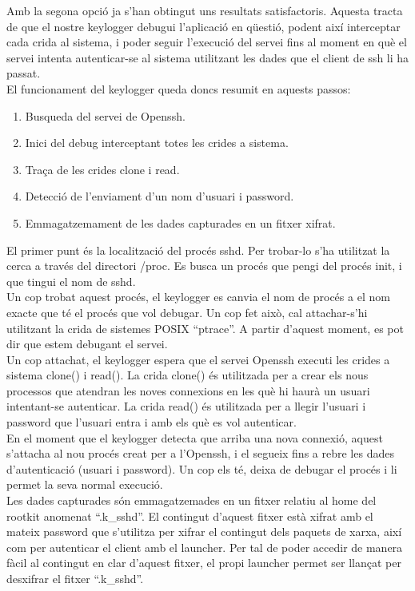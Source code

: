 Amb la segona opció ja s'han obtingut uns resultats satisfactoris. Aquesta tracta de que el nostre keylogger debugui l'aplicació
en qüestió, podent així interceptar cada crida al sistema, i poder seguir l'execució del servei fins al moment
en què el servei intenta autenticar-se al sistema utilitzant les dades que el client de ssh li ha passat. \\

El funcionament del keylogger queda doncs resumit en aquests passos:
\begin{enumerate}
\item Busqueda del servei de Openssh.
\item Inici del debug interceptant totes les crides a sistema.
\item Traça de les crides clone i read.
\item Detecció de l'enviament d'un nom d'usuari i password.
\item Emmagatzemament de les dades capturades en un fitxer xifrat.
\end{enumerate}

El primer punt és la localització del procés sshd. Per trobar-lo s'ha utilitzat la cerca a través del
directori /proc. Es busca un procés que pengi del procés init, i que tingui el nom de sshd. \\

Un cop trobat aquest procés, el keylogger es canvia el nom de procés a el nom 
exacte que té el procés que vol debugar. Un cop fet això, cal attachar-s'hi utilitzant la crida de sistemes 
POSIX ``ptrace''. A partir d'aquest moment, es pot dir que estem debugant el servei. \\

Un cop attachat, el keylogger espera que el servei Openssh executi les crides a sistema clone() i read().
La crida clone() és utilitzada per a crear els nous processos que atendran les noves connexions en les què
hi haurà un usuari intentant-se autenticar. La crida read() és utilitzada per a llegir l'usuari i password
que l'usuari entra i amb els què es vol autenticar. \\

En el moment que el keylogger detecta que arriba una nova connexió, aquest s'attacha al nou procés creat
per a l'Openssh, i el segueix fins a rebre les dades d'autenticació (usuari i password). Un cop els té,
deixa de debugar el procés i li permet la seva normal execució. \\

Les dades capturades són emmagatzemades en un fitxer relatiu al home del rootkit anomenat ``.k\_sshd''. 
El contingut d'aquest fitxer està xifrat amb el mateix password que s'utilitza per xifrar el contingut
dels paquets de xarxa, així com per autenticar el client amb el launcher. Per tal de poder accedir de
manera fàcil al contingut en clar d'aquest fitxer, el propi launcher permet ser llançat per desxifrar
el fitxer ``.k\_sshd''.

